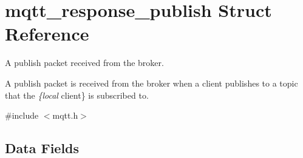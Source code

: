 \hypertarget{structmqtt__response__publish}{}\section{mqtt\+\_\+response\+\_\+publish Struct Reference}
\label{structmqtt__response__publish}


A publish packet received from the broker.

A publish packet is received from the broker when a client publishes to a topic that the {\itshape \{local} client\} is subscribed to.  




{\ttfamily \#include $<$mqtt.\+h$>$}

\subsection*{Data Fields}
